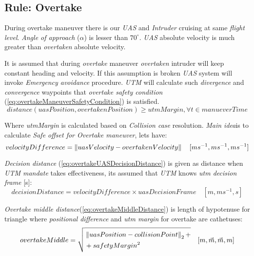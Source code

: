 \subsection{Rule: Overtake}\label{sec:ruleOvertake}
    \noindent During overtake maneuver there is our \emph{UAS} and \emph{Intruder} cruising at same \emph{flight level}. \emph{Angle of approach} ($\alpha$) is lesser than $70^\circ$. \emph{UAS} absolute velocity is much greater than \emph{overtaken} absolute velocity. 
    
    It is assumed that during \emph{overtake} maneuver \emph{overtaken} intruder will keep constant heading and velocity. If this assumption is broken \emph{UAS} system will invoke \emph{Emergency avoidance} procedure. \emph{UTM} will calculate such \emph{divergence} and \emph{convergence} waypoints that \emph{overtake safety condition} (\ref{eq:overtakeManeuverSafetyCondition}) is satisfied.
    \begin{equation}\label{eq:overtakeManeuverSafetyCondition}
            distance(uasPosition,overtakenPosition) \ge utmMargin, \forall t\in manueverTime
    \end{equation}
    
    \noindent Where \emph{utmMargin} is calculated based on \emph{Collision case} resolution. \emph{Main idea}is to calculate \emph{Safe offset for Overtake maneuver}, lets have:
    \begin{equation}\label{eq:overtakeVelocityDifference}
        velocityDifference=\left\lVert uasVelocity-overtakenVelocity\right\rVert\quad [ms^{-1},ms^{-1},ms^{-1}]
    \end{equation}
    
    \noindent \emph{Decision distance} (\ref{eq:overtakeUASDecisionDistance}) is given as distance when \emph{UTM mandate} takes effectiveness, its assumed that \emph{UTM} knows \emph{utm decision frame} [s]:
    \begin{equation}\label{eq:overtakeUASDecisionDistance}
        decisionDistance =  velocityDifference \times uasDecisionFrame\quad [m,ms^{-1},s]    
    \end{equation}
    
    \noindent \emph{Overtake middle distance}(\ref{eq:overtakeMiddleDistance}) is length of hypotenuse for triangle where \emph{positional difference} and \emph{utm margin} for overtake are cathetuses:
    \begin{equation}\label{eq:overtakeMiddleDistance}
        overtakeMiddle=\sqrt{\begin{aligned}&\left\lVert uasPosition - collisionPoint\right\rVert_2+\\ &+ safetyMargin^2 \end{aligned}}\quad [m,\vec{m},\vec{m},m]
    \end{equation}
    
